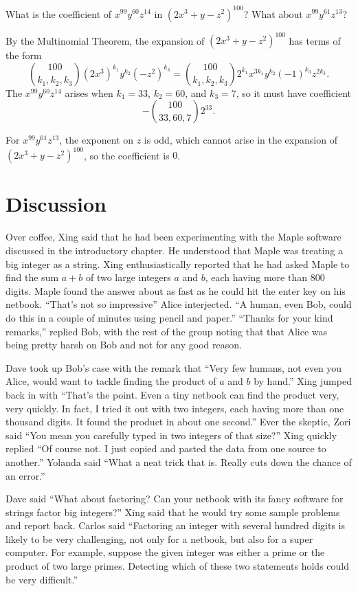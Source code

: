 \begin{example}
  What is the coefficient of $x^{99}y^{60}z^{14}$ in
  $(2x^3+y-z^2)^{100}$? What about $x^{99}y^{61}z^{13}$?

  By the Multinomial Theorem, the expansion of $(2x^3+y-z^2)^{100}$
  has terms of the form
  \[\binom{100}{k_1,k_2,k_3} (2x^3)^{k_1}y^{k_2}(-z^2)^{k_3} =
  \binom{100}{k_1,k_2,k_3} 2^{k_1}x^{3k_1}y^{k_2}(-1)^{k_3}z^{2k_3}.\]
  The $x^{99}y^{60}z^{14}$ arises when $k_1 = 33$, $k_2=60$, and
  $k_3=7$, so it must have coefficient
  \[-\binom{100}{33,60,7}2^{33}.\]

  For $x^{99}y^{61}z^{13}$, the exponent on $z$ is odd, which cannot
  arise in the expansion of $(2x^3+y-z^2)^{100}$, so the coefficient
  is $0$.
\end{example}

\section{Discussion}\label{s:strings:discussion}

Over coffee, Xing said that he had been experimenting with
the Maple software discussed in the introductory chapter.
He understood that Maple was treating a big integer as a string.
Xing enthusiastically reported that he had asked Maple to
find the sum $a+b$ of two large integers $a$ and $b$, each having more
than $800$ digits.  Maple found the answer about as fast as he
could hit the enter key on his netbook. 
``That's not so impressive'' Alice interjected.
``A human, even Bob, could do this in a couple of minutes using
pencil and paper.''  ``Thanks for your kind remarks,'' replied Bob,
with the rest of  the group noting that that Alice was being pretty
harsh on Bob and not for any good reason.

Dave took up Bob's case with the remark that ``Very few humans, not
even you Alice, would want to tackle finding the product of $a$ and
$b$ by hand.''  Xing jumped back in with ``That's the point.  Even
a tiny netbook can find the product very, very quickly.  In fact, I tried
it out with two integers, each having more than one thousand
digits.  It found the product in about one second.''  Ever the
skeptic, Zori said ``You mean you carefully typed in two
integers of that size?''  Xing quickly replied ``Of course not.  I
just copied and pasted the data from one source to another.''
Yolanda said ``What a neat trick that is.  Really cuts down the
chance of an error.''

Dave said ``What about factoring?  Can your netbook with its
fancy software for strings factor big integers?''  Xing
said that he would try some sample problems and report back.  
Carlos said  ``Factoring an integer with several hundred digits is
likely to be very challenging, not only for a netbook, but also for
a super computer.  For example, suppose the given integer was
either a prime or the product of two large primes.  Detecting
which of these two statements holds could be very difficult.''

